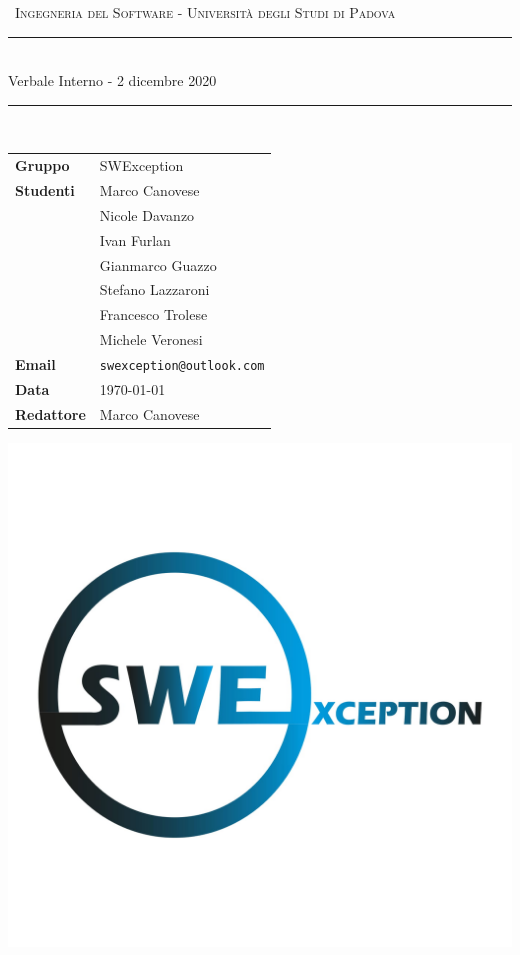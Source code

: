 \documentclass[12pt,italian,a4paper]{article}
\begin{document}

	\begin{titlepage}
		\clearpage\thispagestyle{empty}
		\centering
		\vspace{1cm}

		{\
			\textsc{Ingegneria del Software - Università degli Studi di Padova}
		}
		\vspace{2.5cm}

		\rule{\linewidth}{2mm} \\[0.8cm]
		{ \LARGE \sc Verbale Interno - 2 dicembre 2020}\\[0.55cm]
		\rule{\linewidth}{0.6mm} \\[3.4cm]

		\hspace{2cm}
		\begin{tabular}{l p{5cm}}
			\textbf{Gruppo} & SWException \\[10pt]
			\textbf{Studenti} & Marco Canovese \\ & Nicole Davanzo \\ & Ivan Furlan \\ & Gianmarco Guazzo \\ & Stefano Lazzaroni \\ & Francesco Trolese \\ & Michele Veronesi \\[10pt]
			\textbf{Email} & \texttt{swexception@outlook.com} \\[10pt]
			\textbf{Data} & \today \\
			\textbf{Redattore} & Marco Canovese
		\end{tabular}


		\vfill
		\centering \includegraphics[scale=0.17]{logo.jpg}
	\end{titlepage}
\end{document}
